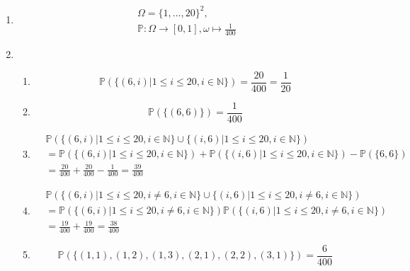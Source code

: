\documentclass{article}
\newcommand{\N}{\mathbb{N}}
\renewcommand{\P}{\mathbb{P}}
\begin{document}
    \subsection{}
    \begin{enumerate}[a]
        \item
            \begin{align*}
                \Omega = \{1,\hdots,20\}^2,\\
                \P: \Omega\rightarrow [0,1],
                \omega\mapsto\frac{1}{400}
            \end{align*}
        \item
            \begin{enumerate}[A]
                \item
                    \begin{equation*}
                        \P(\{(6,i)|1\leq i\leq 20, i\in\N\})
                        =\frac{20}{400}=\frac{1}{20}
                    \end{equation*}
                \item
                    \begin{equation*}
                        \P(\{(6,6)\})
                        =\frac{1}{400}
                    \end{equation*}
                \item
                    \begin{align*}
                        &\P(
                            \{(6,i)|1\leq i\leq 20, i\in\N\}\cup
                            \{(i,6)|1\leq i\leq 20, i\in\N\}
                        )\\
                        &=
                        \P(\{(6,i)|1\leq i\leq 20, i\in\N\})+
                        \P(\{(i,6)|1\leq i\leq 20, i\in\N\})-
                        \P(\{6,6\})\\
                        &=\frac{20}{400}+\frac{20}{400}-\frac{1}{400}
                        =\frac{39}{400}
                    \end{align*}
                \item
                    \begin{align*}
                        &\P(
                            \{(6,i)|1\leq i\leq 20, i\neq 6, i\in\N\}\cup
                            \{(i,6)|1\leq i\leq 20, i\neq 6, i\in\N\}
                        )\\
                        &=
                        \P(\{(6,i)|1\leq i\leq 20, i\neq 6, i\in\N\})
                        \P(\{(i,6)|1\leq i\leq 20, i\neq 6, i\in\N\})\\
                        &=\frac{19}{400}+\frac{19}{400}=\frac{38}{400}
                    \end{align*}
                \item
                    \begin{equation*}
                        \P(\{(1,1),(1,2),(1,3),(2,1),(2,2),(3,1)\})
                        =\frac{6}{400}
                    \end{equation*}
            \end{enumerate}
    \end{enumerate}
\end{document}
